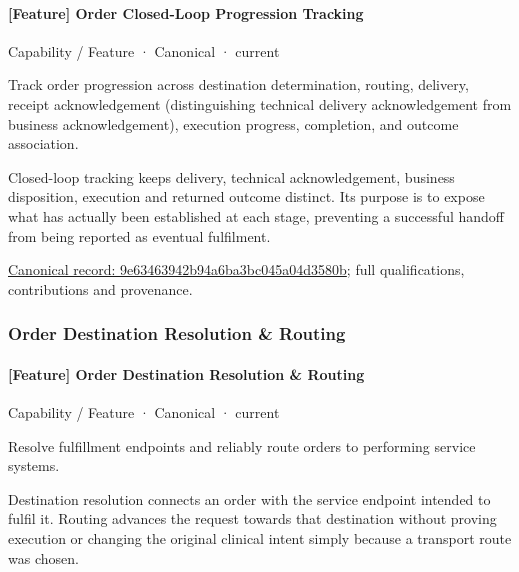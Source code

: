 \paragraph{[Feature] Order Closed-Loop Progression Tracking}

\label{element:9e63463942b94a6ba3bc045a04d3580b}
{\small Capability / Feature · Canonical · current}\par

Track order progression across destination determination, routing, delivery, receipt acknowledgement (distinguishing technical delivery acknowledgement from business acknowledgement), execution progress, completion, and outcome association.



Closed-loop tracking keeps delivery, technical acknowledgement, business disposition, execution and returned outcome distinct. Its purpose is to expose what has actually been established at each stage, preventing a successful handoff from being reported as eventual fulfilment.


{\footnotesize \href{../../../../continuum/strategy/capability/feature/9e63463942b94a6ba3bc045a04d3580b.md}{Canonical record: 9e63463942b94a6ba3bc045a04d3580b}; full qualifications, contributions and provenance.}\par
\subsubsection{Order Destination Resolution \& Routing}

\paragraph{[Feature] Order Destination Resolution \& Routing}

\label{element:9f8f1542efc64e89ad226689291f2635}
{\small Capability / Feature · Canonical · current}\par

Resolve fulfillment endpoints and reliably route orders to performing service systems.



Destination resolution connects an order with the service endpoint intended to fulfil it. Routing advances the request towards that destination without proving execution or changing the original clinical intent simply because a transport route was chosen.


